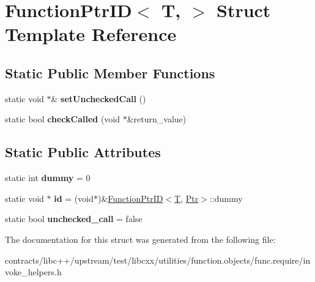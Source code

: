 \hypertarget{struct_function_ptr_i_d}{}\section{Function\+Ptr\+ID$<$ T, $>$ Struct Template Reference}
\label{struct_function_ptr_i_d}
\subsection*{Static Public Member Functions}
\begin{DoxyCompactItemize}
\item 
\mbox{\label{struct_function_ptr_i_d_a9e850930593ccb88d974a63a88a4804d}} 
static void $\ast$\& {\bfseries set\+Unchecked\+Call} ()
\item 
\mbox{\label{struct_function_ptr_i_d_ad819ed302dfce33a81e8bc8b69263b9e}} 
static bool {\bfseries check\+Called} (void $\ast$\&return\+\_\+value)
\end{DoxyCompactItemize}
\subsection*{Static Public Attributes}
\begin{DoxyCompactItemize}
\item 
\mbox{\label{struct_function_ptr_i_d_ad2d59db3eb5be7494637f086cf7beab6}} 
static int {\bfseries dummy} = 0
\item 
\mbox{\label{struct_function_ptr_i_d_a69ced0b5430538c99e92ee62f26a3237}} 
static void $\ast$ {\bfseries id} = (void$\ast$)\&\mbox{\hyperlink{struct_function_ptr_i_d}{Function\+Ptr\+ID}}$<$\mbox{\hyperlink{struct_t}{T}}, \mbox{\hyperlink{struct_ptr}{Ptr}}$>$\+::dummy
\item 
\mbox{\label{struct_function_ptr_i_d_a09e471895b38462b95bfbf2d74da7430}} 
static bool {\bfseries unchecked\+\_\+call} = false
\end{DoxyCompactItemize}


The documentation for this struct was generated from the following file\+:\begin{DoxyCompactItemize}
\item 
contracts/libc++/upstream/test/libcxx/utilities/function.\+objects/func.\+require/invoke\+\_\+helpers.\+h\end{DoxyCompactItemize}
